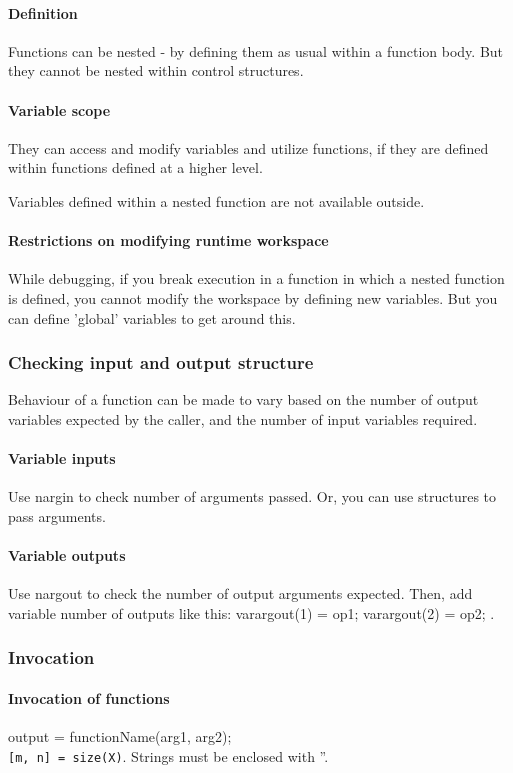 \documentclass[oneside, article]{memoir}
\begin{document}
\paragraph{Definition}
Functions can be nested - by defining them as usual within a function body. But they cannot be nested within control structures.

\paragraph{Variable scope}
They can access and modify variables and utilize functions, if they are defined within functions defined at a higher level.

Variables defined within a nested function are not available outside.

\paragraph{Restrictions on modifying runtime workspace}
While debugging, if you break execution in a function in which a nested function is defined, you cannot modify the workspace by defining new variables. But you can define 'global' variables to get around this.

\subsubsection{Checking input and output structure}
Behaviour of a function can be made to vary based on the number of output variables expected by the caller, and the number of input variables required.

\paragraph*{Variable inputs}
Use nargin to check number of arguments passed. Or, you can use structures to pass arguments.

\paragraph*{Variable outputs}
Use nargout to check the number of output arguments expected. Then, add variable number of outputs like this: varargout(1) = {op1}; varargout(2) = {op2}; .

\subsubsection{Invocation}
\paragraph*{Invocation of functions}
output = functionName(arg1, arg2);\\
\verb'[m, n] = size(X)'. Strings must be enclosed with ''.
\end{document}
